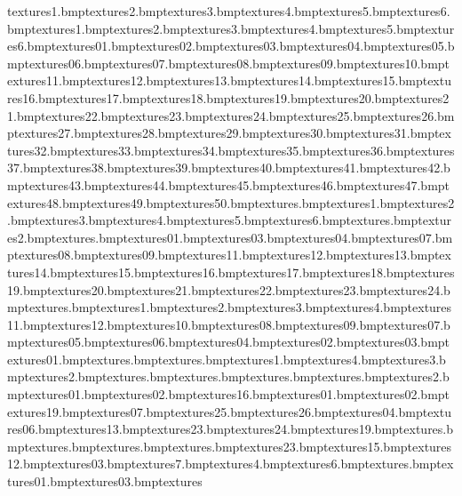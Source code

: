 textures\grassedge1.bmp textures\grassedge2.bmp textures\grassedge3.bmp textures\grassedge4.bmp textures\grassedge5.bmp textures\grassedge6.bmp textures\grassshad1.bmp textures\grassshad2.bmp textures\grassshad3.bmp textures\grassshad4.bmp textures\grassshad5.bmp textures\grassshad6.bmp textures\rockent01.bmp textures\rockent02.bmp textures\rockent03.bmp textures\rockent04.bmp textures\rockent05.bmp textures\rockent06.bmp textures\rockent07.bmp textures\rockent08.bmp textures\rockent09.bmp textures\rockent10.bmp textures\rockent11.bmp textures\rockent12.bmp textures\rockent13.bmp textures\rockent14.bmp textures\rockent15.bmp textures\rockent16.bmp textures\rockent17.bmp textures\rockent18.bmp textures\rockent19.bmp textures\rockent20.bmp textures\rockent21.bmp textures\rockent22.bmp textures\rockent23.bmp textures\rockent24.bmp textures\rockent25.bmp textures\rockent26.bmp textures\rockent27.bmp textures\rockent28.bmp textures\rockent29.bmp textures\rockent30.bmp textures\rockent31.bmp textures\rockent32.bmp textures\rockent33.bmp textures\rockent34.bmp textures\rockent35.bmp textures\rockent36.bmp textures\rockent37.bmp textures\rockent38.bmp textures\rockent39.bmp textures\rockent40.bmp textures\rockent41.bmp textures\rockent42.bmp textures\rockent43.bmp textures\rockent44.bmp textures\rockent45.bmp textures\rockent46.bmp textures\rockent47.bmp textures\rockent48.bmp textures\rockent49.bmp textures\rockent50.bmp textures\rope.bmp textures\sandbed1.bmp textures\sandbed2.bmp textures\sandbed3.bmp textures\sandbed4.bmp textures\sandbed5.bmp textures\sandbed6.bmp textures\sandbedrock.bmp textures\sandbedrock2.bmp textures\stonepal.bmp textures\wall01.bmp textures\wall03.bmp textures\wall04.bmp textures\wall07.bmp textures\wall08.bmp textures\wall09.bmp textures\wall11.bmp textures\wall12.bmp textures\wall13.bmp textures\wall14.bmp textures\wall15.bmp textures\wall16.bmp textures\wall17.bmp textures\wall18.bmp textures\wall19.bmp textures\wall20.bmp textures\wall21.bmp textures\wall22.bmp textures\wall23.bmp textures\wall24.bmp textures\wallblank.bmp textures\wbridge1.bmp textures\wbridge2.bmp textures\wbridge3.bmp textures\wbridge4.bmp textures\safrock11.bmp textures\safrock12.bmp textures\safrock10.bmp textures\safrock08.bmp textures\safrock09.bmp textures\safrock07.bmp textures\safrock05.bmp textures\safrock06.bmp textures\safrock04.bmp textures\safrock02.bmp textures\safrock03.bmp textures\safrock01.bmp textures\hutwood.bmp textures\trunkend.bmp textures\trunk1.bmp textures\trunk4.bmp textures\trunk3.bmp textures\trunk2.bmp textures\branchend.bmp textures\postbox.bmp textures\jhutbrik.bmp textures\jhut.bmp textures\jhutbrik2.bmp textures\wanted01.bmp textures\wanted02.bmp textures\wpaper16.bmp textures\taztop01.bmp textures\taztop02.bmp textures\sign19.bmp textures\sign07.bmp textures\sign25.bmp textures\sign26.bmp textures\sign04.bmp textures\sign06.bmp textures\sharprock13.bmp textures\sharprock23.bmp textures\sandrock24.bmp textures\sandrock19.bmp textures\fgre.bmp textures\fpurp.bmp textures\fblu.bmp textures\plantspikesafari.bmp textures\sandrock23.bmp textures\sandrock15.bmp textures\sign12.bmp textures\safaritemplefloor03.bmp textures\browtree7.bmp textures\browtree4.bmp textures\browtree6.bmp textures\treeend.bmp textures\leaf01.bmp textures\trash03.bmp textures\anvi